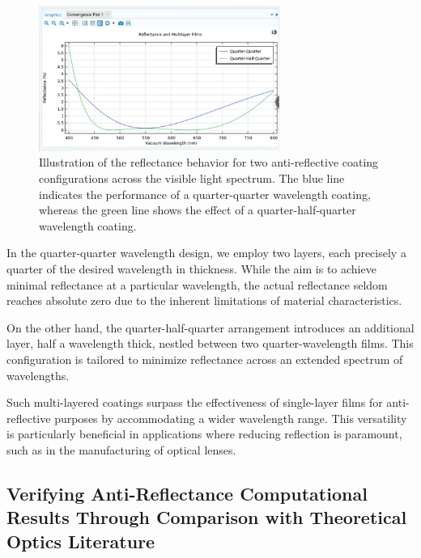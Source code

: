 \begin{figure}[H]
  \centering
  \includegraphics[width=0.7\textwidth]{Chapters/Figures/Chapter 4 Figures/Quarter-Half-Quarter.png}
  \caption{Illustration of the reflectance behavior for two anti-reflective coating configurations across the visible light spectrum. The blue line indicates the performance of a quarter-quarter wavelength coating, whereas the green line shows the effect of a quarter-half-quarter wavelength coating.}
  \label{fig:both quarter-quarter and quarter-half-quarter}
\end{figure}

In the quarter-quarter wavelength design, we employ two layers, each precisely a quarter of the desired wavelength in thickness. While the aim is to achieve minimal reflectance at a particular wavelength, the actual reflectance seldom reaches absolute zero due to the inherent limitations of material characteristics.

On the other hand, the quarter-half-quarter arrangement introduces an additional layer, half a wavelength thick, nestled between two quarter-wavelength films. This configuration is tailored to minimize reflectance across an extended spectrum of wavelengths.

Such multi-layered coatings surpass the effectiveness of single-layer films for anti-reflective purposes by accommodating a wider wavelength range. This versatility is particularly beneficial in applications where reducing reflection is paramount, such as in the manufacturing of optical lenses.


\subsection{Verifying Anti-Reflectance Computational Results Through Comparison with Theoretical Optics Literature}

